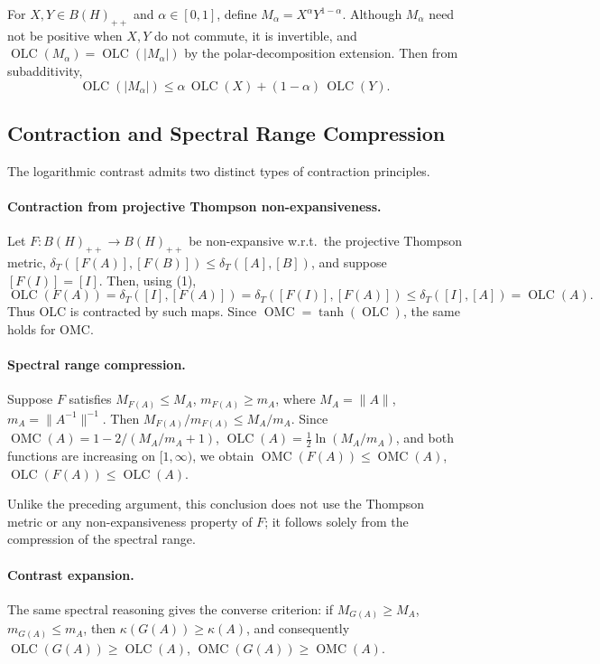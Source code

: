 \documentclass{article}
\theoremstyle{remark}
\providecommand{\QLC}{\operatorname{OLC}}
\providecommand{\QMC}{\operatorname{OMC}}
\begin{document}
For $X,Y\in B(H)_{++}$ and $\alpha\in[0,1]$, define $M_\alpha=X^\alpha Y^{1-\alpha}$. Although $M_\alpha$ need not be positive when $X,Y$ do not commute, it is invertible, and $\QLC(M_\alpha)=\QLC(|M_\alpha|)$ by the polar-decomposition extension. Then from subadditivity,
\[
\QLC(|M_\alpha|) \le \alpha\,\QLC(X) + (1-\alpha)\,\QLC(Y). \tag{6}
\]

\subsection{Contraction and Spectral Range Compression}

The logarithmic contrast admits two distinct types of contraction principles.

\paragraph{Contraction from projective Thompson non-expansiveness.} Let $F:B(H)_{++}\to B(H)_{++}$ be non-expansive w.r.t.\ the projective Thompson metric, $\delta_T([F(A)],[F(B)])\le\delta_T([A],[B])$, and suppose $[F(I)]=[I]$. Then, using (1),
\[
\QLC(F(A)) = \delta_T([I],[F(A)]) = \delta_T([F(I)],[F(A)]) \le \delta_T([I],[A]) = \QLC(A).
\]
Thus OLC is contracted by such maps. Since $\QMC=\tanh(\QLC)$, the same holds for OMC.

\paragraph{Spectral range compression.} Suppose $F$ satisfies $M_{F(A)}\le M_A$, $m_{F(A)}\ge m_A$, where $M_A=\|A\|$, $m_A=\|A^{-1}\|^{-1}$. Then $M_{F(A)}/m_{F(A)}\le M_A/m_A$. Since $\QMC(A)=1-2/(M_A/m_A+1)$, $\QLC(A)=\tfrac12\ln(M_A/m_A)$, and both functions are increasing on $[1,\infty)$, we obtain $\QMC(F(A))\le\QMC(A)$, $\QLC(F(A))\le\QLC(A)$.

Unlike the preceding argument, this conclusion does not use the Thompson metric or any non-expansiveness property of $F$; it follows solely from the compression of the spectral range.

\paragraph{Contrast expansion.} The same spectral reasoning gives the converse criterion: if $M_{G(A)}\ge M_A$, $m_{G(A)}\le m_A$, then $\kappa(G(A))\ge\kappa(A)$, and consequently $\QLC(G(A))\ge\QLC(A)$, $\QMC(G(A))\ge\QMC(A)$.
\end{document}
